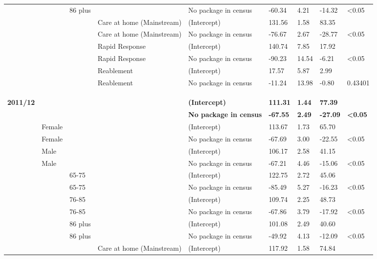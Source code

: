\documentclass[]{article}
\begin{document}
\begin{landscape}
\begin{longtable}[c]{@{}lllllllll@{}}
 &  & 86 plus &  & No package in census & -60.34 & 4.21 & -14.32 & \textless{}0.05 \\
 &  &  & Care at home (Mainstream) & (Intercept) & 131.56 & 1.58 & 83.35 &  \\
 &  &  & Care at home (Mainstream) & No package in census & -76.67 & 2.67 & -28.77 & \textless{}0.05 \\
 &  &  & Rapid Response & (Intercept) & 140.74 & 7.85 & 17.92 &  \\
 &  &  & Rapid Response & No package in census & -90.23 & 14.54 & -6.21 & \textless{}0.05 \\
 &  &  & Reablement & (Intercept) & 17.57 & 5.87 & 2.99 &  \\
 &  &  & Reablement & No package in census & -11.24 & 13.98 & -0.80 & 0.43401 \\
 \\
 \\
 \\
\textbf{2011/12} & \textbf{} & \textbf{} & \textbf{} & \textbf{(Intercept)} & \textbf{111.31} & \textbf{1.44} & \textbf{77.39} & \textbf{} \\
\textbf{} & \textbf{} & \textbf{} & \textbf{} & \textbf{No package in census} & \textbf{-67.55} & \textbf{2.49} & \textbf{-27.09} & \textbf{\textless{}0.05} \\
 & Female &  &  & (Intercept) & 113.67 & 1.73 & 65.70 &  \\
 & Female &  &  & No package in census & -67.69 & 3.00 & -22.55 & \textless{}0.05 \\
 & Male &  &  & (Intercept) & 106.17 & 2.58 & 41.15 &  \\
 & Male &  &  & No package in census & -67.21 & 4.46 & -15.06 & \textless{}0.05 \\
 &  & 65-75 &  & (Intercept) & 122.75 & 2.72 & 45.06 &  \\
 &  & 65-75 &  & No package in census & -85.49 & 5.27 & -16.23 & \textless{}0.05 \\
 &  & 76-85 &  & (Intercept) & 109.74 & 2.25 & 48.73 &  \\
 &  & 76-85 &  & No package in census & -67.86 & 3.79 & -17.92 & \textless{}0.05 \\
 &  & 86 plus &  & (Intercept) & 101.08 & 2.49 & 40.60 &  \\
 &  & 86 plus &  & No package in census & -49.92 & 4.13 & -12.09 & \textless{}0.05 \\
 &  &  & Care at home (Mainstream) & (Intercept) & 117.92 & 1.58 & 74.84 &  \\

\end{longtable}
\end{landscape}
\end{document}
